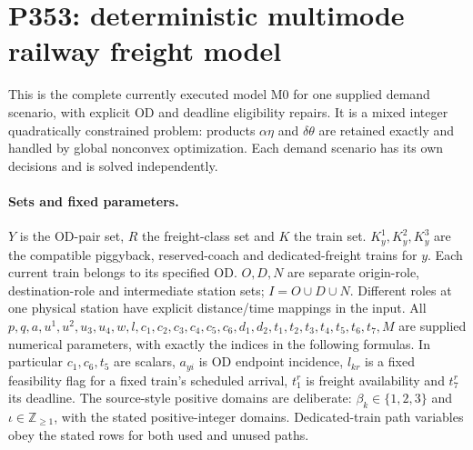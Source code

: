 \documentclass[11pt]{article}
\begin{document}
\section*{P353: deterministic multimode railway freight model}
This is the complete currently executed model M0 for one supplied demand
scenario, with explicit OD and deadline eligibility repairs. It is a mixed
integer quadratically constrained problem: products
$\alpha\eta$ and $\delta\theta$ are retained exactly and handled by global
nonconvex optimization. Each demand scenario has its own decisions and is solved independently.

\paragraph{Sets and fixed parameters.}
$Y$ is the OD-pair set, $R$ the freight-class set and $K$ the train set.
$K_y^1,K_y^2,K_y^3$ are the compatible piggyback, reserved-coach and
dedicated-freight trains for $y$. Each current train belongs to its specified
OD. $O,D,N$ are separate origin-role, destination-role and intermediate
station sets; $I=O\cup D\cup N$. Different roles at one physical station
have explicit distance/time mappings in the input.
All $p,q,a,u^1,u^2,u_3,u_4,w,l,c_1,c_2,c_3,c_4,c_5,c_6,
d_1,d_2,t_1,t_2,t_3,t_4,t_5,t_6,t_7,M$ are supplied numerical parameters,
with exactly the indices in the following formulas.
In particular $c_1,c_6,t_5$ are scalars, $a_{yi}$ is OD endpoint incidence,
$l_{kr}$ is a fixed feasibility flag for a fixed train's scheduled arrival,
$t_1^r$ is freight availability and $t_7^r$ its deadline.
The source-style positive domains are deliberate: $\beta_k\in\{1,2,3\}$
and $\iota\in\mathbb Z_{\ge1}$, with the stated positive-integer domains.
Dedicated-train path variables obey the stated rows for both used and unused paths.
\end{document}
